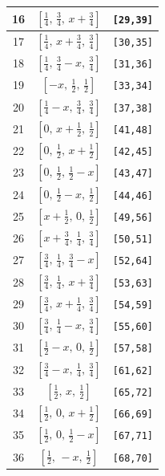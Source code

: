 \documentclass[fleqn,8pt]{jsarticle}
\begin{document}
\begin{longtable}{ccc}
16 & $\left[ \frac{1}{4},\, \frac{3}{4},\, x + \frac{3}{4} \right]$ & {\tt [29,39]} \\ \hline
17 & $\left[ \frac{1}{4},\, x + \frac{3}{4},\, \frac{3}{4} \right]$ & {\tt [30,35]} \\ \hline
18 & $\left[ \frac{1}{4},\, \frac{3}{4} - x,\, \frac{3}{4} \right]$ & {\tt [31,36]} \\ \hline
19 & $\left[ - x,\, \frac{1}{2},\, \frac{1}{2} \right]$ & {\tt [33,34]} \\ \hline
20 & $\left[ \frac{1}{4} - x,\, \frac{3}{4},\, \frac{3}{4} \right]$ & {\tt [37,38]} \\ \hline
21 & $\left[ 0,\, x + \frac{1}{2},\, \frac{1}{2} \right]$ & {\tt [41,48]} \\ \hline
22 & $\left[ 0,\, \frac{1}{2},\, x + \frac{1}{2} \right]$ & {\tt [42,45]} \\ \hline
23 & $\left[ 0,\, \frac{1}{2},\, \frac{1}{2} - x \right]$ & {\tt [43,47]} \\ \hline
24 & $\left[ 0,\, \frac{1}{2} - x,\, \frac{1}{2} \right]$ & {\tt [44,46]} \\ \hline
25 & $\left[ x + \frac{1}{2},\, 0,\, \frac{1}{2} \right]$ & {\tt [49,56]} \\ \hline
26 & $\left[ x + \frac{3}{4},\, \frac{1}{4},\, \frac{3}{4} \right]$ & {\tt [50,51]} \\ \hline
27 & $\left[ \frac{3}{4},\, \frac{1}{4},\, \frac{3}{4} - x \right]$ & {\tt [52,64]} \\ \hline
28 & $\left[ \frac{3}{4},\, \frac{1}{4},\, x + \frac{3}{4} \right]$ & {\tt [53,63]} \\ \hline
29 & $\left[ \frac{3}{4},\, x + \frac{1}{4},\, \frac{3}{4} \right]$ & {\tt [54,59]} \\ \hline
30 & $\left[ \frac{3}{4},\, \frac{1}{4} - x,\, \frac{3}{4} \right]$ & {\tt [55,60]} \\ \hline
31 & $\left[ \frac{1}{2} - x,\, 0,\, \frac{1}{2} \right]$ & {\tt [57,58]} \\ \hline
32 & $\left[ \frac{3}{4} - x,\, \frac{1}{4},\, \frac{3}{4} \right]$ & {\tt [61,62]} \\ \hline
33 & $\left[ \frac{1}{2},\, x,\, \frac{1}{2} \right]$ & {\tt [65,72]} \\ \hline
34 & $\left[ \frac{1}{2},\, 0,\, x + \frac{1}{2} \right]$ & {\tt [66,69]} \\ \hline
35 & $\left[ \frac{1}{2},\, 0,\, \frac{1}{2} - x \right]$ & {\tt [67,71]} \\ \hline
36 & $\left[ \frac{1}{2},\, - x,\, \frac{1}{2} \right]$ & {\tt [68,70]} \\ \hline

\end{longtable}
\end{document}
